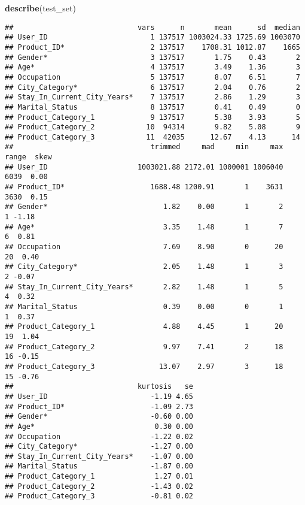 \documentclass[]{article}
\newenvironment{Shaded}{\begin{snugshade}}{\end{snugshade}}
\newcommand{\KeywordTok}[1]{\textcolor[rgb]{0.13,0.29,0.53}{\textbf{#1}}}
\newcommand{\NormalTok}[1]{#1}
\begin{document}
\begin{Shaded}
\begin{Highlighting}[]
\KeywordTok{describe}\NormalTok{(test_set)}
\end{Highlighting}
\end{Shaded}

\begin{verbatim}
##                             vars      n       mean      sd  median
## User_ID                        1 137517 1003024.33 1725.69 1003070
## Product_ID*                    2 137517    1708.31 1012.87    1665
## Gender*                        3 137517       1.75    0.43       2
## Age*                           4 137517       3.49    1.36       3
## Occupation                     5 137517       8.07    6.51       7
## City_Category*                 6 137517       2.04    0.76       2
## Stay_In_Current_City_Years*    7 137517       2.86    1.29       3
## Marital_Status                 8 137517       0.41    0.49       0
## Product_Category_1             9 137517       5.38    3.93       5
## Product_Category_2            10  94314       9.82    5.08       9
## Product_Category_3            11  42035      12.67    4.13      14
##                                trimmed     mad     min     max range  skew
## User_ID                     1003021.88 2172.01 1000001 1006040  6039  0.00
## Product_ID*                    1688.48 1200.91       1    3631  3630  0.15
## Gender*                           1.82    0.00       1       2     1 -1.18
## Age*                              3.35    1.48       1       7     6  0.81
## Occupation                        7.69    8.90       0      20    20  0.40
## City_Category*                    2.05    1.48       1       3     2 -0.07
## Stay_In_Current_City_Years*       2.82    1.48       1       5     4  0.32
## Marital_Status                    0.39    0.00       0       1     1  0.37
## Product_Category_1                4.88    4.45       1      20    19  1.04
## Product_Category_2                9.97    7.41       2      18    16 -0.15
## Product_Category_3               13.07    2.97       3      18    15 -0.76
##                             kurtosis   se
## User_ID                        -1.19 4.65
## Product_ID*                    -1.09 2.73
## Gender*                        -0.60 0.00
## Age*                            0.30 0.00
## Occupation                     -1.22 0.02
## City_Category*                 -1.27 0.00
## Stay_In_Current_City_Years*    -1.07 0.00
## Marital_Status                 -1.87 0.00
## Product_Category_1              1.27 0.01
## Product_Category_2             -1.43 0.02
## Product_Category_3             -0.81 0.02
\end{verbatim}
\end{document}
